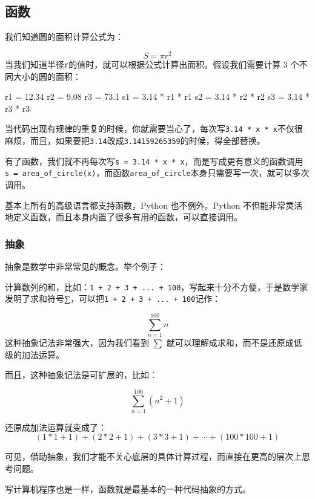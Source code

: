 \hypertarget{ux51fdux6570}{%
\subsection{函数}\label{ux51fdux6570}}

我们知道圆的面积计算公式为：

\[
S = πr^2
\]
当我们知道半径\texttt{r}的值时，就可以根据公式计算出面积。假设我们需要计算
3 个不同大小的圆的面积：

\begin{pythoncode}
r1 = 12.34
r2 = 9.08
r3 = 73.1
s1 = 3.14 * r1 * r1
s2 = 3.14 * r2 * r2
s3 = 3.14 * r3 * r3
\end{pythoncode}

当代码出现有规律的重复的时候，你就需要当心了，每次写\texttt{3.14\ *\ x\ *\ x}不仅很麻烦，而且，如果要把\texttt{3.14}改成\texttt{3.14159265359}的时候，得全部替换。

有了函数，我们就不再每次写\texttt{s\ =\ 3.14\ *\ x\ *\ x}，而是写成更有意义的函数调用\texttt{s\ =\ area\_of\_circle(x)}，而函数\texttt{area\_of\_circle}本身只需要写一次，就可以多次调用。

基本上所有的高级语言都支持函数，Python 也不例外。Python
不但能非常灵活地定义函数，而且本身内置了很多有用的函数，可以直接调用。

\hypertarget{ux62bdux8c61}{%
\subsubsection{抽象}\label{ux62bdux8c61}}

抽象是数学中非常常见的概念。举个例子：

计算数列的和，比如：\texttt{1\ +\ 2\ +\ 3\ +\ ...\ +\ 100}，写起来十分不方便，于是数学家发明了求和符号∑，可以把\texttt{1\ +\ 2\ +\ 3\ +\ ...\ +\ 100}记作：

\[
\sum_{n=1}^{100}n
\] 这种抽象记法非常强大，因为我们看到 \(\sum\)
就可以理解成求和，而不是还原成低级的加法运算。

而且，这种抽象记法是可扩展的，比如：

\[
\sum_{n=1}^{100}(n^2+1)
\]

还原成加法运算就变成了： \[
(1*1+1)+(2*2+1)+(3*3+1)+\cdots+(100*100+1)
\]

可见，借助抽象，我们才能不关心底层的具体计算过程，而直接在更高的层次上思考问题。

写计算机程序也是一样，函数就是最基本的一种代码抽象的方式。

